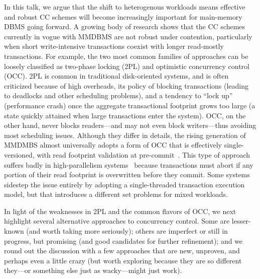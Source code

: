 \documentclass[preprint]{sig-alternate-nocprt}
\begin{document}
In this talk, we argue that the shift to heterogenous workloads means effective and robust CC schemes will become increasingly important for main-memory DBMS going forward. A growing body of research shows that the CC schemes currently in vogue with MMDBMS are not robust under contention, particularly when short write-intensive transactions coexist with longer read-mostly transactions. For example, the two most common families of approaches can be loosely classified as two-phase locking (2PL) and optimistic concurrency control (OCC). 2PL is common in traditional disk-oriented systems, and is often criticized because of high overheads, its policy of blocking transactions (leading to deadlocks and other scheduling problems), and a tendency to ``lock up'' (performance crash) once the aggregate transactional footprint grows too large (a state quickly attained when large transactions enter the system). OCC, on the other hand, never blocks readers---and may not even block writers---thus avoiding most scheduling issues. Although they differ in details, the rising generation of MMDMBS almost universally adopts a form of OCC that is effectively single-versioned, with read footprint validation at pre-commit~\cite{LarsonBDFPZ11,TuZKLM13}. This type of approach suffers badly in high-parallelism systems~\cite{YuBPDS14} because transactions must abort if any portion of their read footprint is overwritten before they commit. Some systems~\cite{Kallman+08,KemperN11} sidestep the issue entirely by adopting a single-threaded transaction execution model, but that introduces a different set problems for mixed workloads.

In light of the weaknesses in 2PL and the common flavors of OCC, we next highlight several alternative approaches to concurrency control. Some are lesser-known (and worth taking more seriously); others are imperfect or still in progress, but promising (and good candidates for further refinement); and we round out the discussion with a few approaches that are new, unproven, and perhaps even a little crazy (but worth exploring because they are so different they---or something else just as wacky---might just work).
\end{document}
